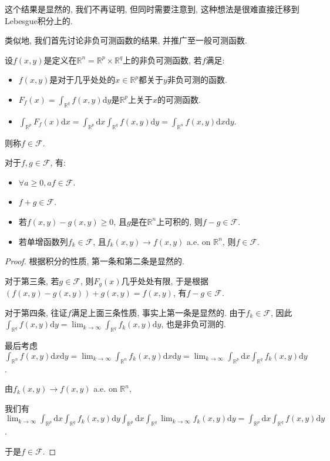 \documentclass[theorem=false,mathfont=none,openany,sub3section]{easybook}
\begin{document}
\begin{remark}
  这个结果是显然的, 我们不再证明, 但同时需要注意到, 这种想法是很难直接迁移到Lebesgue积分上的.\par
\end{remark}

类似地, 我们首先讨论非负可测函数的结果, 并推广至一般可测函数.\par

\begin{lemma}
  设$f(x,y)$是定义在$\mathbb{R}^n=\mathbb{R}^p\times \mathbb{R}^q$上的非负可测函数, 若$f$满足:\par
  \begin{itemize}
    \item $f(x,y)$是对于几乎处处的$x\in \mathbb{R}^p$都关于$y$非负可测的函数.
    \item $F_f(x)=\int_{\mathbb{R}^q}f(x,y)\mathrm{d}y$是$\mathbb{R}^p$上关于$x$的可测函数.
    \item $\int_{\mathbb{R}^p}F_f(x)\mathrm{d}x=\int_{\mathbb{R}^p}\mathrm{d}x\int_{\mathbb{R}^q}f(x,y)\mathrm{d}y=\int_{\mathbb{R}^n}f(x,y)\mathrm{d}x\mathrm{d}y$.
  \end{itemize}
  则称$f\in \mathcal{F}$.\par
  对于$f,g\in \mathcal{F}$, 有:\par
  \begin{itemize}
    \item $\forall a \geqslant 0, af\in \mathcal{F}$.
    \item $f+g\in \mathcal{F}$.
    \item 若$f(x,y)-g(x,y)\geqslant 0$, 且$g$是在$\mathbb{R}^n$上可积的, 则$f-g\in \mathcal{F}$.
    \item 若单增函数列$f_k\in \mathcal{F}$, 且$f_k(x,y)\rightarrow f(x,y)$ a.e. on $\mathbb{R}^n$, 则$f\in \mathcal{F}$.
  \end{itemize}
\end{lemma}

\begin{proof}
  根据积分的性质, 第一条和第二条是显然的.\par
  对于第三条, 若$g\in \mathcal{F}$, 则$F_g(x)$几乎处处有限, 于是根据$(f(x,y)-g(x,y))+g(x,y)=f(x,y)$, 有$f-g\in \mathcal{F}$.\par
  对于第四条, 往证$f$满足上面三条性质, 事实上第一条是显然的. 由于$f_k \in \mathcal{F}$, 因此$\int_{\mathbb{R}^q}f(x,y)\mathrm{d}y=\lim_{k \to \infty}\int_{\mathbb{R}^q}f_k(x,y)\mathrm{d}y$, 也是非负可测的.\par
  最后考虑$\int_{\mathbb{R}^n}f(x,y)\mathrm{d}x\mathrm{d}y=\lim_{k \to \infty}\int_{\mathbb{R}^n}f_k(x,y)\mathrm{d}x\mathrm{d}y=\lim_{k \to \infty}\int_{\mathbb{R}^p}\mathrm{d}x\int_{\mathbb{R}^q}f_k(x,y)\mathrm{d}y$.\par
  由$f_k(x,y)\rightarrow f(x,y)$ a.e. on $\mathbb{R}^n$,\par
  我们有$\lim_{k \to \infty}\int_{\mathbb{R}^p}\mathrm{d}x\int_{\mathbb{R}^q}f_k(x,y)\mathrm{d}y\int_{\mathbb{R}^p}\mathrm{d}x\int_{\mathbb{R}^q}\lim_{k \to \infty}f_k(x,y)\mathrm{d}y=\int_{\mathbb{R}^p}\mathrm{d}x\int_{\mathbb{R}^q}f(x,y)\mathrm{d}y$.\par
  于是$f\in \mathcal{F}$.\par
\end{proof}
\end{document}
